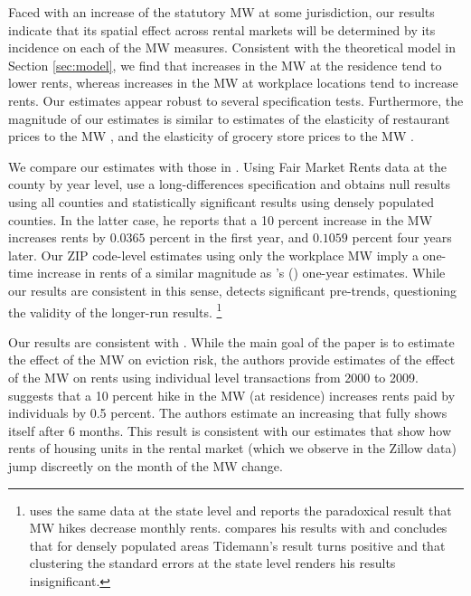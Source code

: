 Faced with an increase of the statutory MW at some jurisdiction, our results
indicate that its spatial effect across rental markets will be determined by 
its incidence on each of the MW measures.
Consistent with the theoretical model in Section \ref{sec:model}, we find that 
increases in the MW at the residence tend to lower rents, whereas increases 
in the MW at workplace locations tend to increase rents.
Our estimates appear robust to several specification tests.
Furthermore, the magnitude of our estimates is similar to estimates of the
elasticity of restaurant prices to the MW \parencite{AllegrettoReich2018},
and the elasticity of grocery store prices to the MW 
\parencite{RenkinEtAl2020, Leung2021}.

We compare our estimates with those in \textcite{Yamagishi2019, AgarwalEtAl2021}.
Using Fair Market Rents data at the county by year level, 
\textcite[][, Tables 1 and 2]{Yamagishi2019} use a long-differences 
specification and obtains null results using all counties and statistically 
significant results using densely populated counties.
In the latter case, he reports that a 10 percent increase in the MW increases
rents by $0.0365$ percent in the first year, and $0.1059$ percent four years 
later.
Our ZIP code-level estimates using only the workplace MW imply a one-time 
increase in rents of a similar magnitude as \citeauthor{Yamagishi2019}'s 
(\citeyear[][Table 2, Column 1]{Yamagishi2019}) one-year estimates.
While our results are consistent in this sense, 
\parencite[][table 3]{Yamagishi2019} detects significant pre-trends,
questioning the validity of the longer-run results.%
\footnote{\textcite{Tidemann2018} uses the same data at the state level and 
reports the paradoxical result that MW hikes decrease monthly rents.
\textcite[][, Appendix C.1.3.]{Yamagishi2019} compares his results with 
\textcite{Tidemann2018} and concludes that for densely populated areas 
Tidemann's result turns positive and that clustering the standard errors at the
state level renders his results insignificant.}

Our results are consistent with \textcite{AgarwalEtAl2021}.
While the main goal of the paper is to estimate the effect of the MW on eviction
risk, the authors provide estimates of the effect of the MW on rents using
individual level transactions from 2000 to 2009.
\textcite[][, Figure 4]{AgarwalEtAl2021} suggests that a 10 percent hike 
in the MW (at residence) increases rents paid by individuals by 0.5 percent.
The authors estimate an increasing that fully shows itself after 6 months.
This result is consistent with our estimates that show how rents of housing 
units in the rental market (which we observe in the Zillow data) jump 
discreetly on the month of the MW change.

